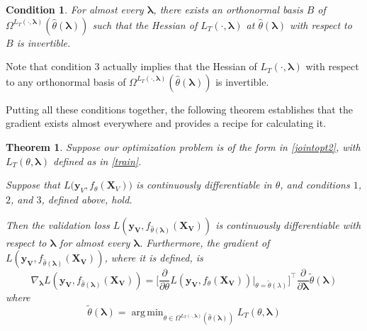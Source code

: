 \documentclass[10pt,letterpaper]{article}
\newtheorem{theorem}{Theorem}
\newtheorem{condition}{Condition}
\DeclareMathOperator*{\argmin}{arg\,min}
\begin{document}
\begin{condition}
For almost every $\boldsymbol{\lambda}$, there exists an orthonormal basis $B$ of $\Omega^{L_T(\cdot, \boldsymbol{\lambda})}(\hat{\theta}\left(\boldsymbol{\lambda}\right))$ such that the Hessian of $L_T\left(\cdot, \boldsymbol{\lambda}\right)$ at $\hat{\theta}\left(\boldsymbol{\lambda}\right)$ with respect to $B$ is invertible.

\end{condition}
Note that condition 3 actually implies that the Hessian of $L_T \left(\cdot, \boldsymbol{\lambda}\right)$ with respect to any orthonormal basis of $\Omega^{L_T(\cdot, \boldsymbol{\lambda})}(\hat{\theta}\left(\boldsymbol{\lambda}\right))$ is invertible.

Putting all these conditions together, the following theorem establishes that the gradient exists almost everywhere and provides a recipe for calculating it.

\begin{theorem}
Suppose our optimization problem is of the form in \eqref{jointopt2}, with $L_T\left(\theta, \boldsymbol{\lambda}\right)$ defined as in \eqref{train}.

Suppose that $L \Big( \boldsymbol{y}_V, f_{\theta}(\boldsymbol{X}_V)\Big)$ is continuously differentiable in $\theta$, and conditions $1$, $2$, and $3$, defined above, hold.

Then the validation loss $L(\boldsymbol{y_V}, f_{\hat \theta(\boldsymbol{\lambda})}(\boldsymbol{X_V}))$ is continuously differentiable with respect to $\boldsymbol{\lambda}$ for almost every $\boldsymbol{\lambda}$. Furthermore, the gradient of $L(\boldsymbol{y_V}, f_{\hat \theta(\boldsymbol{\lambda})}(\boldsymbol{X_V}))$, where it is defined, is
\begin{equation}
\nabla_{\boldsymbol{\lambda}} L(\boldsymbol{y_V}, f_{\hat \theta(\boldsymbol{\lambda})}(\boldsymbol{X_V})) = \Big [ \frac{\partial}{\partial \theta} L(\boldsymbol{y_V}, f_{\theta}(\boldsymbol{X_V})) |_{\theta=\tilde\theta(\lambda)} \Big ]^\top \frac{\partial}{\partial \boldsymbol{\lambda}} \tilde{\theta}(\boldsymbol{\lambda})
\end{equation}
where
\begin{equation}
\tilde{\theta}(\boldsymbol{\lambda}) = \argmin_{\theta \in \Omega^{L_T(\cdot, \boldsymbol{\lambda})}(\hat \theta(\boldsymbol{\lambda}))} L_T(\theta , \boldsymbol{\lambda})
\label{restrictedmodelparams}
\end{equation}
\label{thethrm}
\end{theorem}
\end{document}
